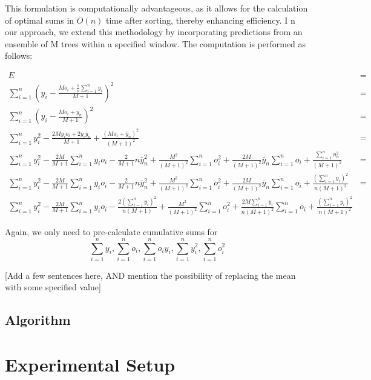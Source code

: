 \documentclass{article}
\begin{document}
This formulation is computationally advantageous, as it allows for the 
calculation of optimal sums in $O(n)$ time after sorting, thereby enhancing efficiency. I
n our approach, we extend this methodology by incorporating predictions from an ensemble 
of M trees within a specified window. The computation is performed as follows:

\begin{align*}
    E &= \\
    \sum_{i=1}^n (y_i - \frac{M o_i + \frac1n \sum_{i=1}^n y_i}{M + 1})^2 &= \\
    \sum_{i=1}^n (y_i - \frac{M o_i + \bar{y}_n}{M + 1})^2 &= \\
    \sum_{i=1}^{n} y_i^2 - \frac{2M y_i o_i + 2y_i \bar{y}_n}{M + 1} + \frac{(M o_i + \bar{y}_n)^2}{(M + 1)^2} &= \\
    \sum_{i=1}^{n} y_i^2 - \frac{2M}{M + 1} \sum_{i=1}^{n} y_i o_i - \frac{2}{M + 1} n\bar{y}_n^2 + \frac{M^2}{(M + 1)^2} \sum_{i=1}^{n} o_i^2 + \frac{2M}{(M + 1)^2} \bar{y}_n \sum_{i=1}^{n} o_i + \frac{\sum_{i=1}^{n} u_n^2}{(M + 1)^2} &= \\
    \sum_{i=1}^{n} y_i^2 - \frac{2M}{M + 1} \sum_{i=1}^{n} y_i o_i - \frac{2}{M + 1} n\bar{y}_n^2 + \frac{M^2}{(M + 1)^2} \sum_{i=1}^{n} o_i^2 + \frac{2M}{(M + 1)^2} \bar{y}_n \sum_{i=1}^{n} o_i + \frac{(\sum_{i=1}^{n} y_i)^2}{n(M + 1)^2} &= \\
    \sum_{i=1}^{n} y_i^2 - \frac{2M}{M + 1} \sum_{i=1}^{n} y_i o_i - \frac{2(\sum_{i=1}^{n} y_i)^2}{n(M + 1)} + \frac{M^2}{(M + 1)^2} \sum_{i=1}^{n} o_i^2 + \frac{2M \sum_{i=1}^n y_i}{n(M + 1)^2} \sum_{i=1}^{n} o_i + \frac{(\sum_{i=1}^{n} y_i)^2}{n(M + 1)^2}
\end{align*}

Again, we only need to pre-calculate cumulative sums for \[
    \sum_{i=1}^{n} y_i, 
    \sum_{i=1}^{n} o_i, 
    \sum_{i=1}^{n} o_i y_i,
    \sum_{i=1}^{n} y_i^2,
    \sum_{i=1}^{n} o_i^2 \]

[Add a few sentences here, AND mention the possibility of replacing the mean with some specified value]

\subsection{Algorithm}

\section{Experimental Setup} \label{sec:experiments}
\end{document}
